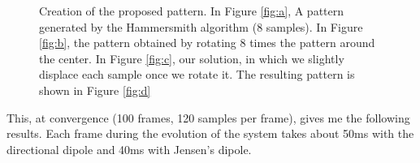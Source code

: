 \documentclass[12pt, twoside,a4paper]{article}
\begin{document}
\begin{figure}[!ht]
{  \label{fig:d}
}
\caption{Creation of the proposed pattern. In Figure \ref{fig:a}, A pattern generated by the Hammersmith algorithm (8 samples). In Figure \ref{fig:b}, the pattern obtained by rotating 8 times the pattern around the center. In Figure \ref{fig:c}, our solution, in which we slightly displace each sample once we rotate it. The resulting pattern is shown in Figure \ref{fig:d}}
\label{fig:img}
\end{figure}


\clearpage
This, at convergence (100 frames, 120 samples per frame), gives me the following results. Each frame during the evolution of the system takes about 50ms with the directional dipole and 40ms with Jensen's dipole.

\begin{figure}[!ht]
\centering
{} 
\\
\end{figure}
\end{document}
